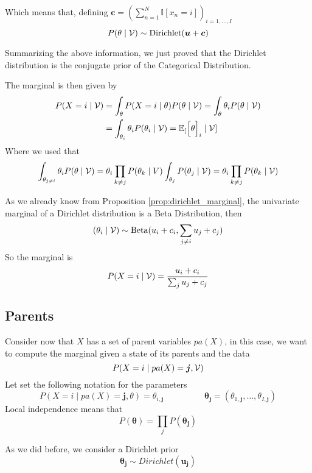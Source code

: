Which means that, defining \(\bm{c} = ( \sum_{n=1}^{N}\mathbb{I}[x_{n} = i])_{i = 1,\dots,I}\)
\[
  P(\theta \mid \mathcal{V}) \sim \text{Dirichlet}(\bm{u} + \bm{c})
\]
\begin{remark}
Summarizing the above information, we just proved that the Dirichlet distribution is the conjugate prior of the Categorical Distribution.
\end{remark}
The marginal is then given by
\[
  \begin{aligned}
    P(X=i \mid \mathcal{V}) &= \int_{\theta}P(X=i \mid \theta)P(\theta \mid \mathcal{V}) =  \int_{\theta}\theta_{i}P(\theta \mid \mathcal{V})\\
    &=  \int_{\theta_{i}}\theta_{i}P(\theta_{i} \mid \mathcal{V}) = \mathbb{E}_{[}\Big[\theta\Big]_{i} \mid \mathcal{V}]
\end{aligned}
\]
Where we used that
\[\int_{\theta_{j \neq i}}\theta_{i} P(\theta \mid \mathcal{V}) = \theta_{i}\prod_{k\neq j}P(\theta_{k} \mid V) \int_{\theta_{j}}P(\theta_{j}\mid \mathcal{V}) = \theta_{i} \prod_{k \neq j}P(\theta_{k} \mid \mathcal{V})\]

As we already know from Proposition \ref{prop:dirichlet_marginal}, the univariate marginal of a Dirichlet distribution is a
Beta Distribution, then
\[
  (\theta_{i} \mid \mathcal{V}) \sim \text{Beta}(u_{i} + c_{i}, \sum_{j\neq i} u_{j} + c_{j})
\]
So the marginal is
\[
  P(X = i \mid \mathcal{V}) = \frac{u_{i} + c_{i}}{\sum_{j}u_{j} + c_{j}}
\]

\subsection{Parents}
Consider now that \(X\) has a set of parent variables \(pa(X)\), in this case,
we want to compute the marginal given a state of its parents and the data
\[
  P(X = i \mid pa(X) = \bm{j}, \mathcal{V})
\]
Let set the following notation for the parameters
\[
  P(X = i \mid pa(X) = \bm{j}, \theta) = \theta_{i,\bm{j}} \hspace{2cm} \bm{\theta_{j}} = (\theta_{1,\bm{j}},\dots, \theta_{I,\bm{j}})
\]
Local independence means that
\[
  P(\bm{\theta}) = \prod_{j}P(\bm{\theta_{j}})
\]

As we did before, we consider a Dirichlet prior
\[
  \bm{\theta_{j}} \sim Dirichlet(\bm{u_{j}})
\]



